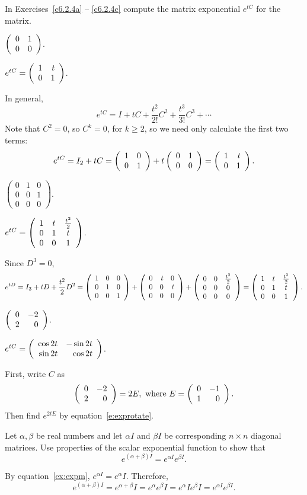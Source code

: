 \documentclass{ximera}
\begin{document}
\noindent In Exercises~\ref{c6.2.4a} -- \ref{c6.2.4c} compute the matrix
exponential $e^{tC}$ for the matrix.
\begin{exercise} \label{c6.2.4a}
                $\left(\begin{array}{rr} 0 & 1\\ 0 &0\end{array}\right)$.

\begin{solution}
\ans $e^{tC} = \left(\begin{array}{rr} 1 & t\\ 0 &1\end{array}\right)$.

\soln In general,
\[
e^{tC} = I + tC + \frac{t^2}{2!}C^2 + \frac{t^3}{3!}C^3 + \cdots
\]
Note that $C^2 = 0$, so $C^k = 0$, for $k \geq 2$, so we need only
calculate the first two terms:
\[
e^{tC} = I_2 + tC = \left(\begin{array}{rr} 1 & 0\\ 0 &1\end{array}\right) + t\left(\begin{array}{rr} 0 & 1\\ 0 &0\end{array}\right) =
\left(\begin{array}{rr} 1 & t\\ 0 &1\end{array}\right).
\]

\end{solution}
\end{exercise}
\begin{exercise} \label{c6.2.4b}
                $\left(\begin{array}{ccc}
                0 & 1 & 0\\
                0 & 0 & 1\\
                0 & 0 & 0 \end{array}\right)$.

\begin{solution}
\ans $e^{tC} =
\left(\begin{array}{ccc} 1 & t & \frac{t^2}{2} \\ 0 & 1 & t \\ 0 & 0 & 1\end{array}\right)$.

\soln Since $D^3 = 0$,
\[
e^{tD} = I_3 + tD + \frac{t^2}{2}D^2 =
\left(\begin{array}{rrr} 1 & 0 & 0 \\ 0 & 1 & 0 \\ 0 & 0 & 1\end{array}\right) +
\left(\begin{array}{rrr} 0 & t & 0 \\ 0 & 0 & t \\ 0 & 0 & 0\end{array}\right) +
\left(\begin{array}{ccc} 0 & 0 & \frac{t^2}{2} \\ 0 & 0 & 0 \\ 0 & 0 & 0\end{array}\right) =
\left(\begin{array}{ccc} 1 & t & \frac{t^2}{2} \\ 0 & 1 & t \\ 0 & 0 & 1\end{array}\right).
\]

\end{solution}
\end{exercise}
\begin{exercise} \label{c6.2.4c}
                $\left(\begin{array}{rr} 0 & -2\\ 2 &0\end{array}\right)$.

\begin{solution}
\ans $e^{tC} =
\left(\begin{array}{rr} \cos 2t & -\sin 2t\\ \sin 2t &\cos 2t\end{array}\right)$.

\soln 
First, write $C$ as
\[
\left(\begin{array}{rr} 0 & -2\\ 2 &0\end{array}\right) = 2E, \hbox{ where } E = \left(\begin{array}{rr} 0 & -1\\ 1 &0\end{array}\right).
\]
Then find $e^{2tE}$ by equation~\eqref{e:exprotate}.

\end{solution}
\end{exercise}

\begin{exercise} \label{c6.2.5}
Let $\alpha,\beta$ be real numbers and let $\alpha I$ and $\beta
I$ be corresponding $n\times n$ diagonal matrices.  Use
properties of the scalar exponential function to show that
\[
     e^{(\alpha + \beta)I} = e^{\alpha I}e^{\beta I}.
\]

\begin{solution}

By equation~\eqref{ex:expm}, $e^{\alpha I} = e^\alpha I$.  Therefore,
\[ e^{(\alpha + \beta)I} = e^{\alpha + \beta}I = e^\alpha e^\beta I
= e^\alpha I e^\beta I = e^{\alpha I}e^{\beta I}. \]

\end{solution}
\end{exercise}
\end{document}
